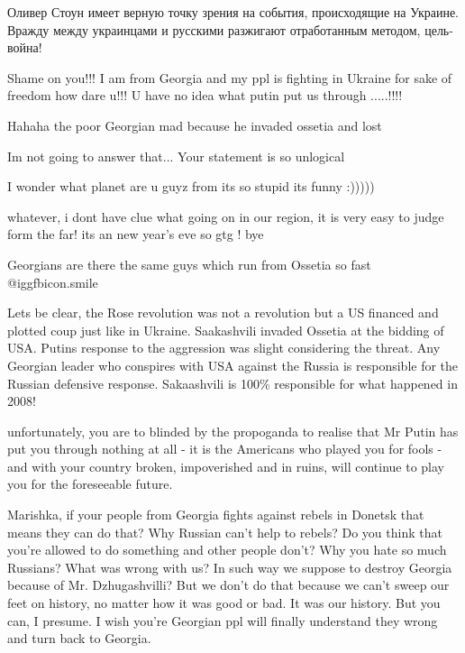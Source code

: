 \begin{itemize}
\begin{itemize}

Оливер Стоун имеет верную точку зрения на события, происходящие на Украине.
Вражду между украинцами и русскими разжигают отработанным методом, цель-война!

\end{itemize} %


Shame on you!!! I am from Georgia and my ppl is fighting in Ukraine for sake of
freedom how dare u!!! U have no idea what putin put us through .....!!!!

\begin{itemize} %
Hahaha the poor Georgian mad because he invaded ossetia and lost


Im not going to answer that... Your statement is so unlogical


I wonder what planet are u guyz from its so stupid its funny :)))))


whatever, i dont have clue what going on in our region, it is very easy to
judge form the far! its an new year's eve so gtg ! bye


Georgians are there the same guys which run from Ossetia so fast  @igg{fbicon.smile} 


Lets be clear, the Rose revolution was not a revolution but a US financed and
plotted coup just like in Ukraine. Saakashvili invaded Ossetia at the bidding
of USA. Putins response to the aggression was slight considering the threat.
Any Georgian leader who conspires with USA against the Russia is responsible
for the Russian defensive response. Sakaashvili is 100\% responsible for what
happened in 2008!


unfortunately, you are to blinded by the propoganda to realise that Mr Putin
has put you through nothing at all - it is the Americans who played you for
fools - and with your country broken, impoverished and in ruins, will continue
to play you for the foreseeable future.


Marishka, if your people from Georgia fights against rebels in Donetsk that
means they can do that? Why Russian can't help to rebels? Do you think that
you're allowed to do something and other people don't? Why you hate so much
Russians? What was wrong with us? In such way we suppose to destroy Georgia
because of Mr. Dzhugashvilli? But we don't do that because we can't sweep our
feet on history, no matter how it was good or bad. It was our history. But you
can, I presume. I wish you're Georgian ppl will finally understand they wrong
and turn back to Georgia.


\end{itemize}
\end{itemize}
